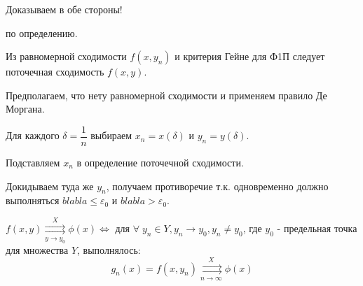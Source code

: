 \begin{col-answer-preambule}
\end{col-answer-preambule}

\begin{plan}
\item Доказываем в обе стороны!
\item \circled{$\Rightarrow$} по определению.
\item \circled{$\Leftarrow$} Из равномерной сходимости $f(x, y_n)$ и критерия Гейне для Ф1П следует поточечная сходимость $f(x, y)$.
\item Предполагаем, что нету равномерной сходимости и применяем правило Де Моргана.
\item Для каждого $\delta = \dfrac{1}{n}$ выбираем $x_n = x(\delta)$ и $y_n = y(\delta)$.
\item Подставляем $x_n$ в определение поточечной сходимости.
\item Докидываем туда же $y_n$, получаем противоречие т.к. одновременно должно выполняться $blabla \leqslant \varepsilon_0$ и $blabla > \varepsilon_0$.
\end{plan}
\begin{theorem}
	$f(x,y) \underset{y \to y_0}{\overset{X}{\rightrightarrows}} \phi(x) \Leftrightarrow$ для $\forall \; y_n \in Y, y_n \to y_0, y_n \ne y_0$, где $y_0$ - предельная точка для множества $Y$, выполнялось:
	\begin{equation}
	\label{eq:lecture04-090}
	g_n(x) = f(x, y_n) \underset{n \to \infty}{\overset{X}{\rightrightarrows}} \phi(x)
	\end{equation}
\end{theorem}
